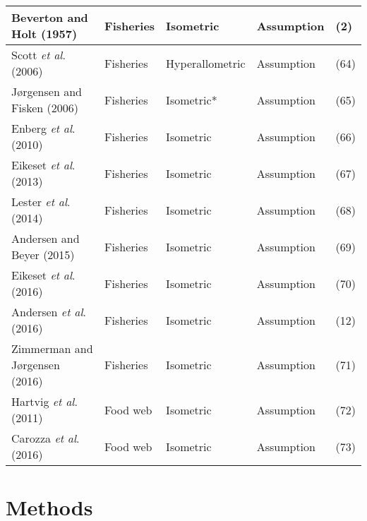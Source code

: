 \documentclass[a4paper]{article} %
\begin{document}
\begin{table}[]
\begin{tabular}{|l|l|l|l|l|}
        Beverton and Holt (1957)                & Fisheries                 & Isometric        & Assumption                        & (2)           \\ \hline
        Scott \textit{et al}. (2006)            & Fisheries                 & Hyperallometric  & Assumption                        & (64)          \\ \hline
        Jørgensen and Fisken (2006)             & Fisheries                 & Isometric*       & Assumption                        & (65)          \\ \hline
        Enberg \textit{et al}. (2010)           & Fisheries                 & Isometric        & Assumption                        & (66)          \\ \hline
        Eikeset \textit{et al}. (2013)          & Fisheries                 & Isometric        & Assumption                        & (67)          \\ \hline
        Lester \textit{et al}. (2014)           & Fisheries                 & Isometric        & Assumption                        & (68)          \\ \hline
        Andersen and Beyer (2015)               & Fisheries                 & Isometric        & Assumption                        & (69)          \\ \hline
        Eikeset \textit{et al}. (2016)          & Fisheries                 & Isometric        & Assumption                        & (70)          \\ \hline
        Andersen \textit{et al}. (2016)         & Fisheries                 & Isometric        & Assumption                        & (12)          \\ \hline
        Zimmerman and Jørgensen (2016)          & Fisheries                 & Isometric        & Assumption                        & (71)          \\ \hline
        Hartvig \textit{et al}. (2011)          & Food web                  & Isometric        & Assumption                        & (72)          \\ \hline
        Carozza \textit{et al}. (2016)          & Food web                  & Isometric        & Assumption                        & (73)          \\ \hline
        \end{tabular}
    \end{table}
\section{Methods}\thispagestyle{empty}
\lipsum
\end{document}
